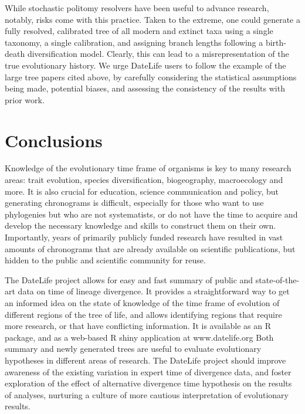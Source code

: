 \documentclass[english,man]{apa6}
\begin{document}
While stochastic politomy resolvers have been useful to advance research, notably, risks come with this practice.
Taken to the extreme, one could generate a fully resolved, calibrated tree of all modern and extinct taxa using a single taxonomy, a single calibration, and assigning branch lengths following a birth-death diversification model. Clearly, this can lead to a misrepresentation of the true evolutionary history.
We urge DateLife users to follow the example of the large tree papers cited above, by carefully considering the statistical assumptions being made, potential biases, and assessing the consistency of the results with prior work.

\hypertarget{conclusions}{%
\section{Conclusions}\label{conclusions}}

Knowledge of the evolutionary time frame of organisms is key to many research areas: trait evolution, species diversification, biogeography, macroecology and more. It is also crucial for education, science communication and policy, but generating chronograms is difficult, especially for those who want to use phylogenies but who are not systematists, or do not have the time to acquire and develop the necessary knowledge and skills to construct them on their own. Importantly, years of primarily publicly funded research have resulted in vast amounts of chronograms that are already available on scientific publications, but hidden to the public and scientific community for reuse.

The DateLife project allows for easy and fast summary of public and state-of-the-art data on time of lineage divergence.
It provides a straightforward way to get an informed idea on the state of knowledge of the time frame of evolution of different regions of the tree of life, and allows identifying regions that require more research, or that have conflicting information.
It is available as an R package, and as a web-based R shiny application at www.datelife.org
Both summary and newly generated trees are useful to evaluate evolutionary hypotheses in different areas of research. The DateLife project should improve awareness of the existing variation in expert time of divergence data, and foster exploration of the effect of alternative divergence time hypothesis on the results of analyses, nurturing a culture of more cautious interpretation of evolutionary results.
\end{document}

